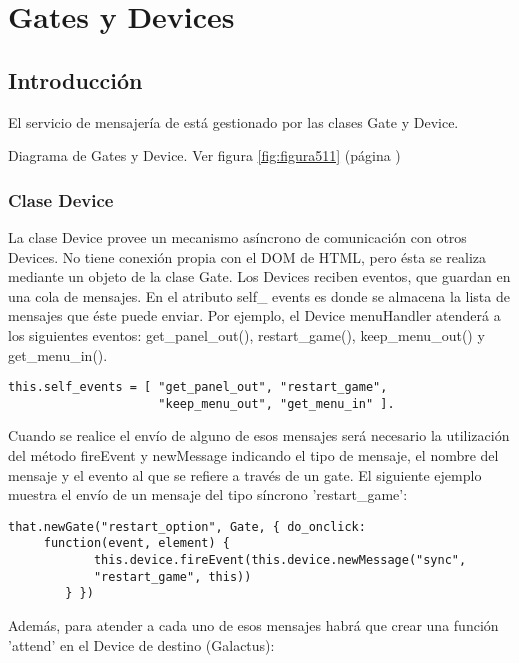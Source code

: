 \section{Gates y Devices}
\label{sec:gates_devices}

\subsection{Introducción}
\label{subsection:intro_gates}

El servicio de mensajería de \lluvia{} está gestionado por las clases Gate y Device.

Diagrama de Gates y Device. Ver figura \ref{fig:figura511} (página \pageref{fig:figura511})

\subsubsection{Clase Device}
\label{subsubsection:device}

La clase Device provee un mecanismo asíncrono de comunicación con otros Devices. No tiene conexión propia con el DOM de HTML, pero ésta se 
realiza mediante un objeto de la clase Gate. Los Devices reciben eventos, que guardan en una cola de mensajes. En el atributo self\_ events es 
donde se almacena la lista de mensajes que éste puede enviar. Por ejemplo, el Device menuHandler atenderá a los siguientes eventos: 
get\_panel\_out(), restart\_game(), keep\_menu\_out() y get\_menu\_in().\\

\begin{verbatim}
this.self_events = [ "get_panel_out", "restart_game", 
                     "keep_menu_out", "get_menu_in" ].
\end{verbatim}

Cuando se realice  el envío de alguno de esos mensajes será necesario la utilización del método fireEvent y newMessage indicando el tipo de
mensaje, el nombre del mensaje y el evento al que se refiere a través de un gate. El siguiente ejemplo muestra el envío de un mensaje del tipo 
síncrono 'restart\_game': 

\begin{verbatim}
that.newGate("restart_option", Gate, { do_onclick: 
     function(event, element) {
            this.device.fireEvent(this.device.newMessage("sync",
            "restart_game", this))
        } })
\end{verbatim}

Además, para atender a cada uno de esos mensajes habrá que crear una función 'attend' en el Device de destino (Galactus):\

